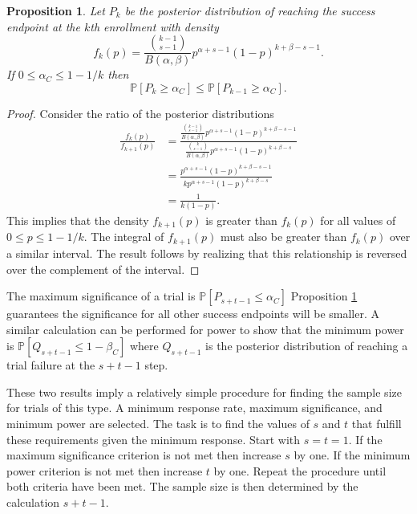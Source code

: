 \documentclass[12pt]{article}
\newtheorem{prop}{Proposition}
\begin{document}
\begin{prop} \label{alpha_c}
Let $P_k$ be the posterior distribution of reaching the success endpoint
at the $k$th enrollment with density
\begin{equation*}
f_k(p) = \frac{ {k-1 \choose s-1} }{B(\alpha, \beta)} p^{\alpha +s -1} 
    (1-p)^{k+\beta-s-1}.
\end{equation*}
If $0 \leq \alpha_C \leq 1 - 1/k$ then 
\begin{equation}
\mathbb{P} \left[P_k \geq \alpha_C \right]  \leq
  \mathbb{P} \left[P_{k-1} \geq \alpha_C \right].
\end{equation}
\end{prop}
\begin{proof}
Consider the ratio of the posterior distributions
\begin{align*}
\frac{f_k(p)}{f_{k+1}(p)} &= 
  \frac{\frac{ {k-1 \choose s-1} }{B(\alpha, \beta)} p^{\alpha +s -1} 
    (1-p)^{k+\beta-s-1}}
    {\frac{ {k \choose s-1} }{B(\alpha, \beta)} p^{\alpha +s -1} 
    (1-p)^{k+\beta-s}} \\
  &= \frac{ p^{\alpha +s -1} (1-p)^{k+\beta-s-1} }
    {k p^{\alpha +s -1} (1-p)^{k+\beta-s}} \\
  &= \frac{1}{k(1-p)}.
\end{align*}
This implies that the density $f_{k+1}(p)$ is greater than $f_k(p)$ for
all values of $0 \leq p \leq 1 - 1/k$. The
integral of $f_{k+1}(p)$ must also be greater than $f_k(p)$ over a similar
interval. The result follows by realizing that this relationship is reversed
over the complement of the interval.
\end{proof}

The maximum significance of a trial is 
$\mathbb{P} \left[P_{s+t-1} \leq \alpha_C \right]$ Proposition \ref{alpha_c}
guarantees the significance for all other success endpoints will be smaller.
A similar calculation can be performed for power to show that the minimum
power is $\mathbb{P} \left[Q_{s+t-1} \leq 1 - \beta_C \right]$ where
$Q_{s+t-1}$ is the posterior distribution of reaching a trial failure
at the $s+t-1$ step.

These two results imply a relatively simple procedure for finding the sample
size for trials of this type. A minimum response rate, maximum significance,
and minimum power are selected. The task is to find the values of $s$ and
$t$ that fulfill these requirements given the minimum response. Start with 
$s = t = 1$. If the maximum significance criterion is not met then increase
$s$ by one. If the minimum power criterion is not met then increase $t$ by
one. Repeat the procedure until both criteria have been met. The sample
size is then determined by the calculation $s+t-1$.
\end{document}

